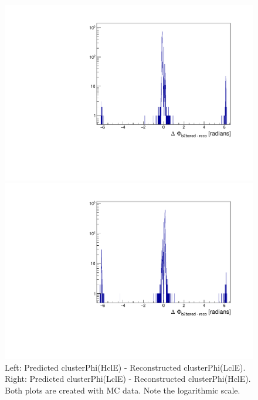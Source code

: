 \documentclass[a4paper,11pt,twosided,final,german,openbib,pdftex,listof=totoc,bibliography=totoc]{scrbook}
\begin{document}
\begin{appendix}
\begin{figure}[h!]
	\centering
	\begin{minipage}[b]{0.45\linewidth}
		\centering
		\includegraphics[width=\textwidth]{AnhangPlots/b2b_ProbeTag_Data_Whole.pdf}
	\end{minipage}
	\hspace{0.5cm}
	\begin{minipage}[b]{0.45\linewidth}
		\centering
		\includegraphics[width=\textwidth]{AnhangPlots/b2b_TagProbe_Data_Whole.pdf}
	\end{minipage}
	\caption[b2bClusterPhi - clusterPhi For MC (Whole Range)]{Left: Predicted clusterPhi(HclE) - Reconstructed clusterPhi(LclE). Right: Predicted clusterPhi(LclE) - Reconstructed clusterPhi(HclE). Both plots are created with MC data. Note the logarithmic scale.}
	\label{fig:b2bMC_Whole}
\end{figure}





\end{appendix}
\end{document}
